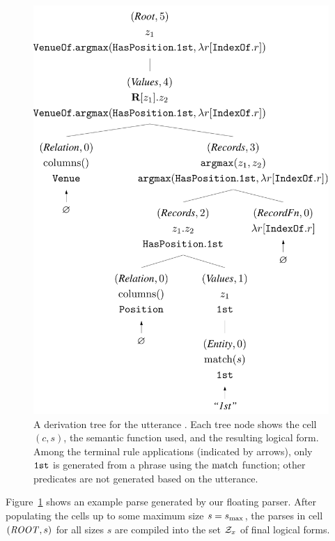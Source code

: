 \begin{figure}[t]
\centering
\includegraphics[scale=0.35]{sfig/parsetrees.slides/baseParse.pdf}
\caption[Derivation tree of the running example.]
{A derivation tree for the utterance \runningEx.
Each tree node shows the cell $(c,s)$,
the semantic function used,
and the resulting logical form.
Among the terminal rule applications (indicated by arrows),
only $\texttt{1st}$ is generated from a phrase  using the $\mathrm{match}$ function;
other predicates are not generated based on the utterance.}
\label{fig:floating-parse-ex}
\end{figure}

Figure~\ref{fig:floating-parse-ex} shows
an example parse generated by our floating parser.
After populating the cells up to some maximum size $s = s_\mathrm{max}$,
the parses in cell $(\text{\emph{ROOT}}, s)$ for all sizes $s$
are compiled into the set $\mathcal{Z}_x$ of final logical forms.

